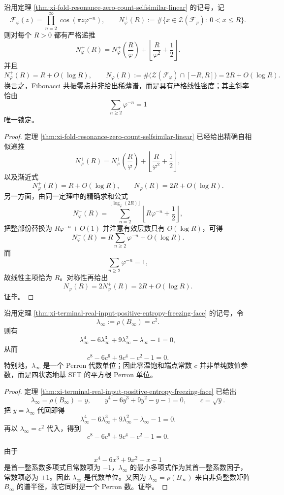 \begin{theorem}\label{thm:xi-time-part9zo-fibonacci-cosine-zeros-weyl-law}
沿用定理 \ref{thm:xi-fold-resonance-zero-count-selfsimilar-linear} 的记号，记
\[
\mathcal F_\varphi(z)=\prod_{n=2}^{\infty}\cos(\pi z\varphi^{-n}),
\qquad
N_\varphi^+(R):=\#\bigl\{x\in \mathcal Z(\mathcal F_\varphi):\ 0<x\le R\bigr\}.
\]
则对每个 \(R>0\) 都有严格递推
\[
N_\varphi^+(R)=N_\varphi^+\!\left(\frac{R}{\varphi}\right)+\left\lfloor \frac{R}{\varphi^2}+\frac12\right\rfloor.
\]
并且
\[
N_\varphi^+(R)=R+O(\log R),
\qquad
N_\varphi(R):=\#\bigl(\mathcal Z(\mathcal F_\varphi)\cap[-R,R]\bigr)=2R+O(\log R).
\]
换言之，Fibonacci 共振零点并非给出稀薄谱，而是具有严格线性密度；其主斜率恰由
\[
\sum_{n\ge 2}\varphi^{-n}=1
\]
唯一锁定。
\end{theorem}
\begin{proof}
定理 \ref{thm:xi-fold-resonance-zero-count-selfsimilar-linear} 已经给出精确自相似递推
\[
N_\varphi^+(R)=N_\varphi^+\!\left(\frac{R}{\varphi}\right)+\left\lfloor \frac{R}{\varphi^2}+\frac12\right\rfloor,
\]
以及渐近式
\[
N_\varphi^+(R)=R+O(\log R),
\qquad
N_\varphi(R)=2R+O(\log R).
\]
另一方面，由同一定理中的精确求和公式
\[
N_\varphi^+(R)=
\sum_{n=2}^{\lfloor \log_\varphi(2R)\rfloor}
\left\lfloor R\varphi^{-n}+\frac12\right\rfloor,
\]
把整部份替换为 \(R\varphi^{-n}+O(1)\) 并注意有效层数只有 \(O(\log R)\)，可得
\[
N_\varphi^+(R)
=
R\sum_{n\ge 2}\varphi^{-n}+O(\log R).
\]
而
\[
\sum_{n\ge 2}\varphi^{-n}=1,
\]
故线性主项恰为 \(R\)。对称性再给出
\[
N_\varphi(R)=2N_\varphi^+(R)=2R+O(\log R).
\]
证毕。
\end{proof}

\begin{theorem}\label{thm:xi-time-part9zo-zero-temp-quartic-perron-unit}
沿用定理 \ref{thm:xi-terminal-real-input-positive-entropy-freezing-face} 的记号，令
\[
\lambda_\infty:=\rho(B_\infty)=c^2.
\]
则有
\[
\lambda_\infty^4-6\lambda_\infty^3+9\lambda_\infty^2-\lambda_\infty-1=0,
\]
从而
\[
c^8-6c^6+9c^4-c^2-1=0.
\]
特别地，\(\lambda_\infty\) 是一个 Perron 代数单位；因此零温饱和端点常数 \(c\) 并非单纯数值参数，而是四状态地基 SFT 的平方根 Perron 单位。
\end{theorem}
\begin{proof}
定理 \ref{thm:xi-terminal-real-input-positive-entropy-freezing-face} 已给出
\[
\lambda_\infty=\rho(B_\infty)=y,
\qquad
y^4-6y^3+9y^2-y-1=0,
\qquad
c=\sqrt y.
\]
把 \(y=\lambda_\infty\) 代回即得
\[
\lambda_\infty^4-6\lambda_\infty^3+9\lambda_\infty^2-\lambda_\infty-1=0.
\]
再以 \(\lambda_\infty=c^2\) 代入，得到
\[
c^8-6c^6+9c^4-c^2-1=0.
\]

由于
\[
x^4-6x^3+9x^2-x-1
\]
是首一整系数多项式且常数项为 \(-1\)，\(\lambda_\infty\) 的最小多项式作为其首一整系数因子，常数项必为 \(\pm 1\)。因此 \(\lambda_\infty\) 是代数单位。又因为 \(\lambda_\infty=\rho(B_\infty)\) 来自非负整数矩阵 \(B_\infty\) 的谱半径，故它同时是一个 Perron 数。证毕。
\end{proof}

